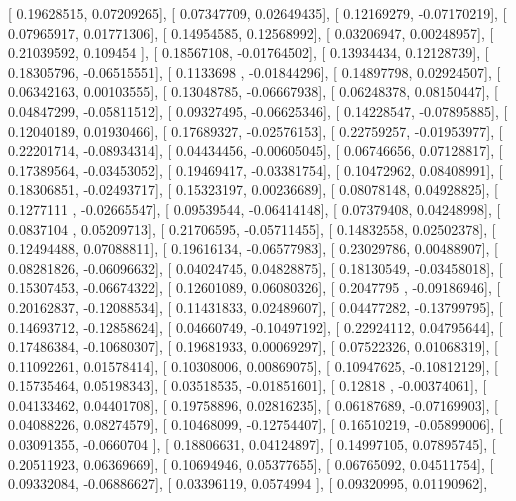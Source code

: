 \documentclass{article}
\begin{document}
       [ 0.19628515,  0.07209265],
       [ 0.07347709,  0.02649435],
       [ 0.12169279, -0.07170219],
       [ 0.07965917,  0.01771306],
       [ 0.14954585,  0.12568992],
       [ 0.03206947,  0.00248957],
       [ 0.21039592,  0.109454  ],
       [ 0.18567108, -0.01764502],
       [ 0.13934434,  0.12128739],
       [ 0.18305796, -0.06515551],
       [ 0.1133698 , -0.01844296],
       [ 0.14897798,  0.02924507],
       [ 0.06342163,  0.00103555],
       [ 0.13048785, -0.06667938],
       [ 0.06248378,  0.08150447],
       [ 0.04847299, -0.05811512],
       [ 0.09327495, -0.06625346],
       [ 0.14228547, -0.07895885],
       [ 0.12040189,  0.01930466],
       [ 0.17689327, -0.02576153],
       [ 0.22759257, -0.01953977],
       [ 0.22201714, -0.08934314],
       [ 0.04434456, -0.00605045],
       [ 0.06746656,  0.07128817],
       [ 0.17389564, -0.03453052],
       [ 0.19469417, -0.03381754],
       [ 0.10472962,  0.08408991],
       [ 0.18306851, -0.02493717],
       [ 0.15323197,  0.00236689],
       [ 0.08078148,  0.04928825],
       [ 0.1277111 , -0.02665547],
       [ 0.09539544, -0.06414148],
       [ 0.07379408,  0.04248998],
       [ 0.0837104 ,  0.05209713],
       [ 0.21706595, -0.05711455],
       [ 0.14832558,  0.02502378],
       [ 0.12494488,  0.07088811],
       [ 0.19616134, -0.06577983],
       [ 0.23029786,  0.00488907],
       [ 0.08281826, -0.06096632],
       [ 0.04024745,  0.04828875],
       [ 0.18130549, -0.03458018],
       [ 0.15307453, -0.06674322],
       [ 0.12601089,  0.06080326],
       [ 0.2047795 , -0.09186946],
       [ 0.20162837, -0.12088534],
       [ 0.11431833,  0.02489607],
       [ 0.04477282, -0.13799795],
       [ 0.14693712, -0.12858624],
       [ 0.04660749, -0.10497192],
       [ 0.22924112,  0.04795644],
       [ 0.17486384, -0.10680307],
       [ 0.19681933,  0.00069297],
       [ 0.07522326,  0.01068319],
       [ 0.11092261,  0.01578414],
       [ 0.10308006,  0.00869075],
       [ 0.10947625, -0.10812129],
       [ 0.15735464,  0.05198343],
       [ 0.03518535, -0.01851601],
       [ 0.12818   , -0.00374061],
       [ 0.04133462,  0.04401708],
       [ 0.19758896,  0.02816235],
       [ 0.06187689, -0.07169903],
       [ 0.04088226,  0.08274579],
       [ 0.10468099, -0.12754407],
       [ 0.16510219, -0.05899006],
       [ 0.03091355, -0.0660704 ],
       [ 0.18806631,  0.04124897],
       [ 0.14997105,  0.07895745],
       [ 0.20511923,  0.06369669],
       [ 0.10694946,  0.05377655],
       [ 0.06765092,  0.04511754],
       [ 0.09332084, -0.06886627],
       [ 0.03396119,  0.0574994 ],
       [ 0.09320995,  0.01190962],
\end{document}
